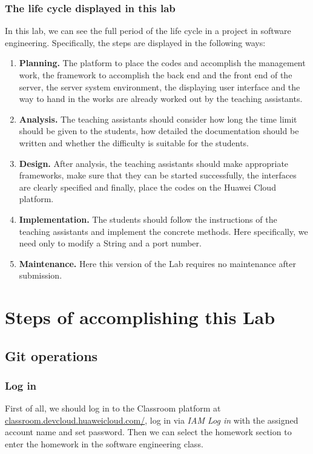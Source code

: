 \documentclass[a4paper]{report}
\begin{document}
\subsection{The life cycle displayed in this lab}
In this lab, we can see the full period of the life cycle in a project in software engineering. Specifically, the steps are displayed in the following ways:
\begin{enumerate}
  \item \textbf{Planning.} The platform to place the codes and accomplish the management work, the framework to accomplish the back end and the front end of the server, the server system environment, the displaying user interface and the way to hand in the works are already worked out by the teaching assistants.
  \item \textbf{Analysis.} The teaching assistants should consider how long the time limit should be given to the students, how detailed the documentation should be written and whether the difficulty is suitable for the students.
  \item \textbf{Design.} After analysis, the teaching assistants should make appropriate frameworks, make sure that they can be started successfully, the interfaces are clearly specified and finally, place the codes on the Huawei Cloud platform.
  \item \textbf{Implementation.} The students should follow the instructions of the teaching assistants and implement the concrete methods. Here specifically, we need only to modify a String and a port number.
  \item \textbf{Maintenance.} Here this version of the Lab requires no maintenance after submission.
\end{enumerate}
\chapter{Steps of accomplishing this Lab}
\section{Git operations}
\subsection{Log in}
First of all, we should log in to the Classroom platform at \url{classroom.devcloud.huaweicloud.com/}, log in via \emph{IAM Log in} with the assigned account name and set password. Then we can select the homework section to enter the homework in the software engineering class.
\end{document}

